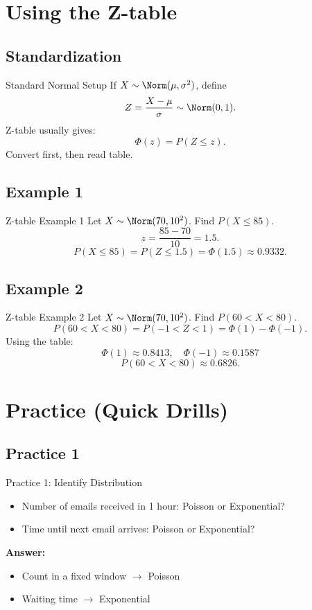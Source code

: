 \documentclass[aspectratio=169]{beamer}
\begin{document}
\section{Using the Z-table}

\subsection{Standardization}
\begin{frame}{Standard Normal Setup}
  If \(X\sim\Norm(\mu,\sigma^2)\), define
  \[
    Z=\frac{X-\mu}{\sigma}\sim\Norm(0,1).
  \]
  Z-table usually gives:
  \[
    \Phi(z)=P(Z\le z).
  \]
  Convert first, then read table.
\end{frame}

\subsection{Example 1}
\begin{frame}{Z-table Example 1}
  Let \(X\sim\Norm(70,10^2)\). Find \(P(X\le 85)\).
  \[
    z=\frac{85-70}{10}=1.5.
  \]
  \[
    P(X\le 85)=P(Z\le 1.5)=\Phi(1.5)\approx 0.9332.
  \]
\end{frame}

\subsection{Example 2}
\begin{frame}{Z-table Example 2}
  Let \(X\sim\Norm(70,10^2)\). Find \(P(60<X<80)\).
  \[
    P(60<X<80)=P\!\left(-1<Z<1\right)=\Phi(1)-\Phi(-1).
  \]
  Using the table:
  \[
    \Phi(1)\approx 0.8413,\quad \Phi(-1)\approx 0.1587
  \]
  \[
    P(60<X<80)\approx 0.6826.
  \]
\end{frame}

\section{Practice (Quick Drills)}

\subsection{Practice 1}
\begin{frame}{Practice 1: Identify Distribution}
  \begin{itemize}
    \item Number of emails received in 1 hour: Poisson or Exponential?
    \item Time until next email arrives: Poisson or Exponential?
  \end{itemize}
  \pause
  \textbf{Answer:}
  \begin{itemize}
    \item Count in a fixed window \(\rightarrow\) Poisson
    \item Waiting time \(\rightarrow\) Exponential
  \end{itemize}
\end{frame}
\end{document}
